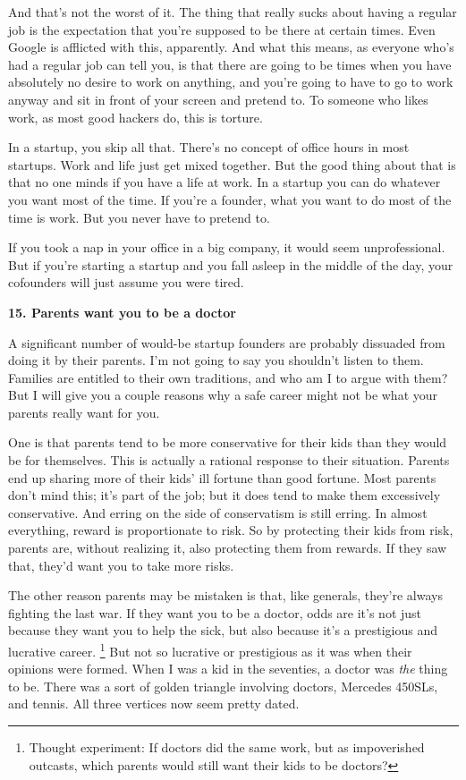 \documentclass[12pt]{book}
\begin{document}
And that's not the worst of it. The thing that really sucks about having
a regular job is the expectation that you're supposed to be there at
certain times. Even Google is afflicted with this, apparently. And what
this means, as everyone who's had a regular job can tell you, is that
there are going to be times when you have absolutely no desire to work
on anything, and you're going to have to go to work anyway and sit in
front of your screen and pretend to. To someone who likes work, as most
good hackers do, this is torture.

In a startup, you skip all that. There's no concept of office hours in
most startups. Work and life just get mixed together. But the good thing
about that is that no one minds if you have a life at work. In a startup
you can do whatever you want most of the time. If you're a founder, what
you want to do most of the time is work. But you never have to pretend
to.

If you took a nap in your office in a big company, it would seem
unprofessional. But if you're starting a startup and you fall asleep in
the middle of the day, your cofounders will just assume you were tired.

\textbf{15. Parents want you to be a doctor}

A significant number of would-be startup founders are probably dissuaded
from doing it by their parents. I'm not going to say you shouldn't
listen to them. Families are entitled to their own traditions, and who
am I to argue with them? But I will give you a couple reasons why a safe
career might not be what your parents really want for you.

One is that parents tend to be more conservative for their kids than
they would be for themselves. This is actually a rational response to
their situation. Parents end up sharing more of their kids' ill fortune
than good fortune. Most parents don't mind this; it's part of the job;
but it does tend to make them excessively conservative. And erring on
the side of conservatism is still erring. In almost everything, reward
is proportionate to risk. So by protecting their kids from risk, parents
are, without realizing it, also protecting them from rewards. If they
saw that, they'd want you to take more risks.

The other reason parents may be mistaken is that, like generals, they're
always fighting the last war. If they want you to be a doctor, odds are
it's not just because they want you to help the sick, but also because
it's a prestigious and lucrative career. \footnote{Thought experiment: If doctors did the same work, but as
impoverished outcasts, which parents would still want their kids to be
doctors?} But not
so lucrative or prestigious as it was when their opinions were formed.
When I was a kid in the seventies, a doctor was \emph{the} thing to be.
There was a sort of golden triangle involving doctors, Mercedes 450SLs,
and tennis. All three vertices now seem pretty dated.
\end{document}

